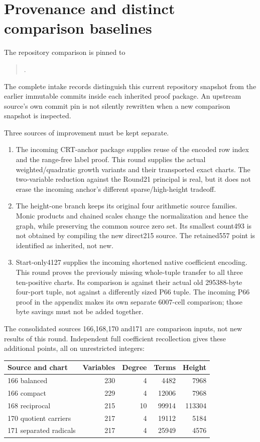 \section{Provenance and distinct comparison baselines}
\label{sec:comparison}
The repository comparison is pinned to
\begin{quote}\small
{}.
\end{quote}
The complete intake records distinguish this current repository snapshot
from the earlier immutable commits inside each inherited proof package.
An upstream source's own commit pin is not silently rewritten when a
new comparison snapshot is inspected.

Three sources of improvement must be kept separate.
\begin{enumerate}
\item The incoming CRT-anchor package supplies reuse of the encoded row
index and the range-free label proof. This round supplies the actual
weighted/quadratic growth variants and their transported exact charts.
The two-variable reduction against the Round21 principal is real, but
it does not erase the incoming anchor's different sparse/high-height
tradeoff.
\item The height-one branch keeps its original four arithmetic source
families. Monic products and chained scales change the normalization
and hence the graph, while preserving the common source zero set.
Its smallest count493 is not obtained by compiling the new direct215
source. The retained557 point is identified as inherited, not new.
\item Start-only4127 supplies the incoming shortened native coefficient
encoding. This round proves the previously missing whole-tuple transfer
to all three ten-positive charts. Its comparison is against their actual
old 295388-byte four-port tuple, not against a differently sized P66 tuple.
The incoming P66 proof in the appendix makes its own separate 6007-cell
comparison; those byte savings must not be added together.
\end{enumerate}
The consolidated sources 166,168,170 and171 are comparison inputs, not
new results of this round. Independent full coefficient recollection gives
these additional points, all on unrestricted integers:
\begin{center}\small
\begin{tabular}{@{}lrrrr@{}}\toprule
Source and chart & Variables & Degree & Terms & Height\\\midrule
166 balanced &230&4&4482&7968\\
166 compact &229&4&12006&7968\\
168 reciprocal &215&10&99914&113304\\
170 quotient carriers &217&4&19112&5184\\
171 separated radicals &217&4&25949&4576\\\bottomrule
\end{tabular}
\end{center}
